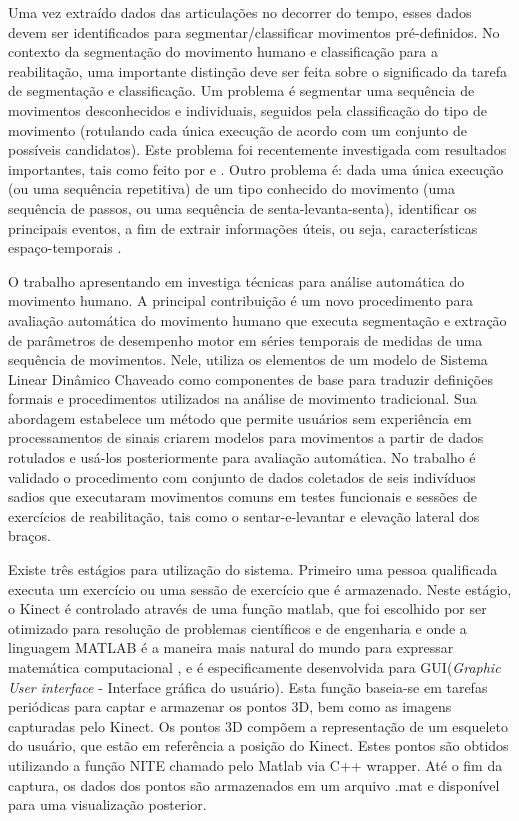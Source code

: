 Uma vez extraído dados das articulações no decorrer do tempo, esses dados devem ser identificados para segmentar/classificar movimentos pré-definidos.
  No contexto da segmentação do movimento humano e classificação para a reabilitação, 
uma importante distinção deve ser feita sobre o significado da tarefa de segmentação e classificação. 
Um problema é segmentar uma sequência de movimentos desconhecidos e 
individuais, seguidos pela classificação do tipo de movimento (rotulando cada única
 execução de acordo com um conjunto de possíveis candidatos). 
Este problema foi recentemente investigada com resultados importantes, tais como 
feito por \cite{LinaAndDkulic} e \cite{PdeDios}. Outro problema é: dada uma única 
execução (ou uma sequência repetitiva) de um tipo conhecido do movimento
 (uma sequência de passos, ou uma sequência de senta-levanta-senta), identificar os principais eventos, 
a fim de extrair informações úteis, ou seja, características espaço-temporais \cite{roberto}.

O trabalho apresentando em \cite{roberto} investiga técnicas para análise automática
do movimento humano. A principal contribuição é um novo procedimento para avaliação
automática do movimento humano que executa segmentação e extração de parâmetros de
desempenho motor em séries temporais de medidas de uma sequência de movimentos. Nele,
utiliza os elementos de um modelo de Sistema Linear Dinâmico Chaveado como componentes
 de base para traduzir definições formais e procedimentos utilizados na análise de
movimento tradicional. Sua abordagem estabelece um método que permite usuários sem
experiência em processamentos de sinais criarem modelos para movimentos a partir de dados rotulados e usá-los posteriormente para avaliação automática. No trabalho é validado o
procedimento com conjunto de dados coletados de seis indivíduos sadios que executaram
movimentos comuns em testes funcionais e sessões de exercícios de reabilitação, tais como
o sentar-e-levantar e elevação lateral dos braços.

Existe três estágios para utilização do sistema. Primeiro uma pessoa qualificada
executa um exercício ou uma sessão de exercício que é armazenado. Neste estágio,
o Kinect é controlado através de uma função matlab, que foi escolhido por ser otimizado para resolução de problemas científicos e de engenharia e onde
 a linguagem MATLAB é a maneira mais natural do mundo para expressar matemática computacional \cite{matlab}, e é especificamente desenvolvida
para GUI(\textit{Graphic User interface} - Interface gráfica do usuário). Esta
função baseia-se em tarefas periódicas para captar e armazenar os pontos 3D, bem
como as imagens capturadas pelo Kinect. Os pontos 3D compõem a representação de
um esqueleto do usuário, que estão em referência a posição do Kinect. Estes pontos
são obtidos utilizando a função NITE \cite{openNI} chamado pelo Matlab via C++
wrapper. Até o fim da captura, os dados dos pontos são armazenados em um arquivo
.mat e disponível para uma visualização posterior.

